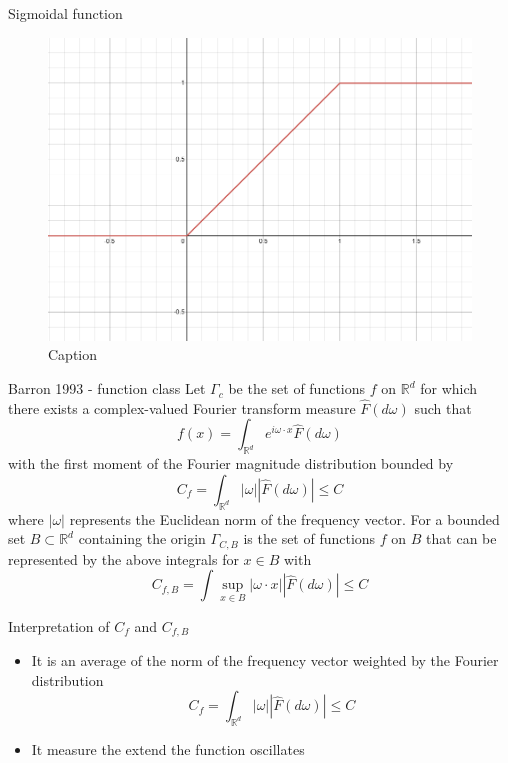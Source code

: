 \documentclass[aspectratio=169]{beamer} %
\begin{document}
\begin{frame}{Sigmoidal function}
    \begin{figure}
        \centering
        \includegraphics[width=0.9\linewidth]{Reinforcement Learning/Curse of Dimensionality/relusig.png}
        \caption{Caption}
        \label{fig:enter-label}
    \end{figure}
\end{frame}

\begin{frame}{Barron 1993 - function class}
Let $\Gamma_c$ be the set of functions $f$ on $\mathbb{R}^d$ for which there exists a complex-valued Fourier transform measure $\hat F(d\omega)$ such that
$$
f(x) = \int_{\mathbb{R}^d} e^{i\omega\cdot x} \hat F(d\omega)
$$
with the first moment of the Fourier magnitude distribution bounded by
$$
C_f = \int_{\mathbb{R}^d} |\omega||\hat F(d\omega)| \le C
$$
where $|\omega|$ represents the Euclidean norm of the frequency vector.
For a bounded set $B\subset\mathbb{R}^d$ containing the origin $\Gamma_{C,B}$ is the set of functions $f$ on $B$ that can be represented by the above integrals for $x\in B$ with
$$
C_{f,B} = \int \sup_{x\in B} |\omega \cdot x| |\hat F(d\omega)|\le C
$$
    
\end{frame}

\begin{frame}{Interpretation of $C_f$ and $C_{f,B}$}
\begin{itemize}
    \item It is an average of the norm of the frequency vector weighted by the Fourier distribution
    $$
C_f = \int_{\mathbb{R}^d} |\omega||\hat F(d\omega)| \le C
$$
\item It measure the extend the function oscillates
\end{itemize}
    
\end{frame}
\end{document}
